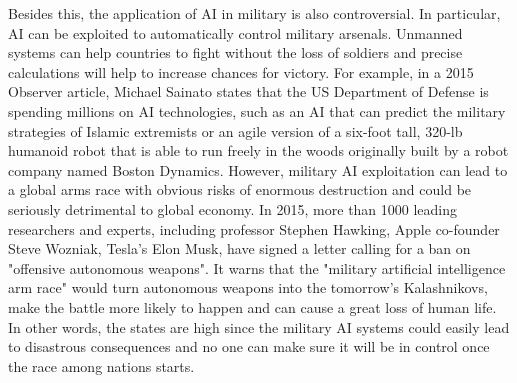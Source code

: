 \documentclass[12pt,a4paper]{article}
\begin{document}
Besides this, the application of AI in military is also controversial. In particular, AI can be exploited to automatically control military arsenals. Unmanned systems can help countries to fight without the loss of soldiers and precise calculations will help to increase chances for victory. For example, in a 2015 Observer article, Michael Sainato states that the US Department of Defense is spending millions on AI technologies, such as an AI that can predict the military strategies of Islamic extremists or an agile version of a six-foot tall, 320-lb humanoid robot that is able to run freely in the woods originally built by a robot company named Boston Dynamics. However, military AI exploitation can lead to a global arms race with obvious risks of enormous destruction and could be seriously detrimental to global economy. In 2015, more than 1000 leading researchers and experts, including professor Stephen Hawking, Apple co-founder Steve Wozniak, Tesla's Elon Musk, have signed a letter calling for a ban on "offensive autonomous weapons". It warns that the "military artificial intelligence arm race" would turn autonomous weapons into the tomorrow's Kalashnikovs, make the battle more likely to happen and can cause a great loss of human life. In other words, the states are high since the military AI systems could easily lead to disastrous consequences and no one can make sure it will be in control once the race among nations starts.
\end{document}
